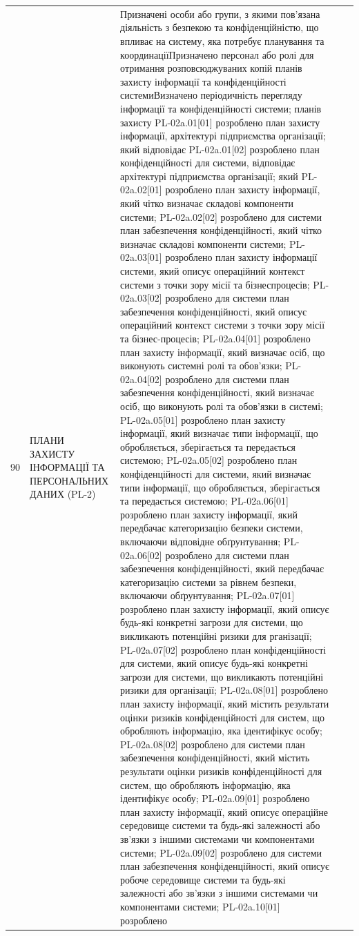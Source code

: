 \documentclass[10pt]{article}
\begin{document}
\begin{longtable}{|c|>{\raggedright\arraybackslash}p{4cm}|>{\raggedright\arraybackslash}p{6cm}|>{\raggedright\arraybackslash}p{2cm}|>{\raggedright\arraybackslash}p{4cm}|}
90 & ПЛАНИ ЗАХИСТУ ІНФОРМАЦІЇ ТА ПЕРСОНАЛЬНИХ ДАНИХ (PL-2) & Призначені особи або групи, з якими пов'язана діяльність з безпекою та конфіденційністю, що впливає на систему, яка потребує планування та координації\newline Призначено персонал або ролі для отримання розповсюджуваних копій планів захисту інформації та конфіденційності системи\newline Визначено періодичність перегляду інформації та конфіденційності системи; планів захисту PL-02a.01[01] розроблено план захисту інформації, архітектурі підприємства організації; який відповідає PL-02a.01[02] розроблено план конфіденційності для системи, відповідає архітектурі підприємства організації; який PL-02a.02[01] розроблено план захисту інформації, який чітко визначає складові компоненти системи; PL-02a.02[02] розроблено для системи план забезпечення конфіденційності, який чітко визначає складові компоненти системи; PL-02a.03[01] розроблено план захисту інформації системи, який описує операційний контекст системи з точки зору місії та бізнеспроцесів; PL-02a.03[02] розроблено для системи план забезпечення конфіденційності, який описує операційний контекст системи з точки зору місії та бізнес-процесів; PL-02a.04[01] розроблено план захисту інформації, який визначає осіб, що виконують системні ролі та обов'язки; PL-02a.04[02] розроблено для системи план забезпечення конфіденційності, який визначає осіб, що виконують ролі та обов'язки в системі; PL-02a.05[01] розроблено план захисту інформації, який визначає типи інформації, що обробляється, зберігається та передається системою; PL-02a.05[02] розроблено план конфіденційності для системи, який визначає типи інформації, що обробляється, зберігається та передається системою; PL-02a.06[01] розроблено план захисту інформації, який передбачає категоризацію безпеки системи, включаючи відповідне обґрунтування; PL-02a.06[02] розроблено для системи план забезпечення конфіденційності, який передбачає категоризацію системи за рівнем безпеки, включаючи обґрунтування; PL-02a.07[01] розроблено план захисту інформації, який описує будь-які конкретні загрози для системи, що викликають потенційні ризики для рганізації; PL-02a.07[02] розроблено план конфіденційності для системи, який описує будь-які конкретні загрози для системи, що викликають потенційні ризики для організації; PL-02a.08[01] розроблено план захисту інформації, який містить результати оцінки ризиків конфіденційності для систем, що обробляють інформацію, яка ідентифікує особу; PL-02a.08[02] розроблено для системи план забезпечення конфіденційності, який містить результати оцінки ризиків конфіденційності для систем, що обробляють інформацію, яка ідентифікує особу; PL-02a.09[01] розроблено план захисту інформації, який описує операційне середовище системи та будь-які залежності або зв'язки з іншими системами чи компонентами системи; PL-02a.09[02] розроблено для системи план забезпечення конфіденційності, який описує робоче середовище системи та будь-які залежності або зв'язки з іншими системами чи компонентами системи; PL-02a.10[01] розроблено 
\end{longtable}
\end{document}
